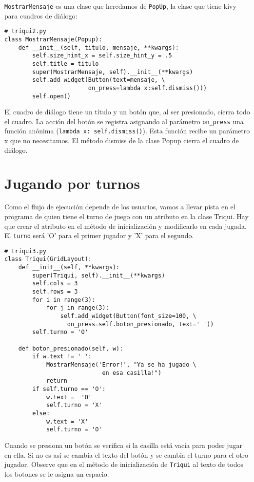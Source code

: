 \texttt{MostrarMensaje} es una clase que heredamos de \texttt{PopUp},
la clase que tiene kivy para cuadros de diálogo:

\begin{lstlisting}
# triqui2.py
class MostrarMensaje(Popup): 
    def __init__(self, titulo, mensaje, **kwargs):
        self.size_hint_x = self.size_hint_y = .5
        self.title = titulo
        super(MostrarMensaje, self).__init__(**kwargs)
        self.add_widget(Button(text=mensaje, \
                        on_press=lambda x:self.dismiss()))
        self.open()
\end{lstlisting}

El cuadro de diálogo tiene un título y un botón que, al ser presionado,
cierra todo el cuadro. La acción del botón se registra asignando al
parámetro \lstinline!on_press!
una función anónima (\lstinline!lambda x: self.dismiss()!).
Esta función recibe un parámetro x que no necesitamos. El método dismiss
de la clase Popup cierra el cuadro de diálogo.

\section{Jugando por turnos}

Como el flujo de ejecución depende de los usuarios, vamos a llevar
pista en el programa de quien tiene el turno de juego con un atributo
en la clase Triqui. Hay que crear el atributo en el método de inicialización
y modificarlo en cada jugada. El \texttt{turno} será 'O' para el primer
jugador y 'X' para el segundo.

\begin{lstlisting}
# triqui3.py
class Triqui(GridLayout):
    def __init__(self, **kwargs):
        super(Triqui, self).__init__(**kwargs)
        self.cols = 3
        self.rows = 3
        for i in range(3):
            for j in range(3):
                self.add_widget(Button(font_size=100, \
                  on_press=self.boton_presionado, text=' '))
        self.turno = 'O'

    def boton_presionado(self, w):
        if w.text != ' ':
            MostrarMensaje('Error!', "Ya se ha jugado \
                            en esa casilla!")
            return
        if self.turno == 'O':
            w.text =  'O'
            self.turno = 'X'
        else:
            w.text = 'X'
            self.turno = 'O'
\end{lstlisting}

Cuando se presiona un botón se verifica si la casilla está vacía para
poder jugar en ella. Si no es así se cambia el texto del botón y se
cambia el turno para el otro jugador. Observe que en el método de
inicialización de \texttt{Triqui} al texto de todos los botones se
le asigna un espacio.

